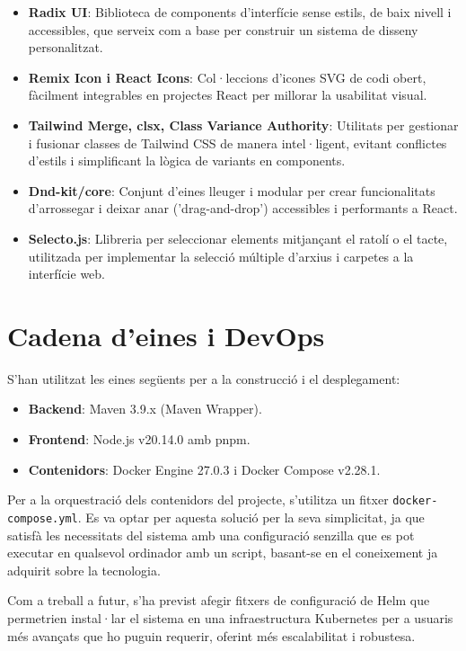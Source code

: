 \begin{itemize}
\item \textbf{Radix UI}: Biblioteca de components d'interfície sense estils, de baix nivell i accessibles, que serveix com a base per construir un sistema de disseny personalitzat.
\item \textbf{Remix Icon i React Icons}: Col·leccions d'icones SVG de codi obert, fàcilment integrables en projectes React per millorar la usabilitat visual.
\item \textbf{Tailwind Merge, clsx, Class Variance Authority}: Utilitats per gestionar i fusionar classes de Tailwind CSS de manera intel·ligent, evitant conflictes d'estils i simplificant la lògica de variants en components.
\item \textbf{Dnd-kit/core}: Conjunt d'eines lleuger i modular per crear funcionalitats d'arrossegar i deixar anar ('drag-and-drop') accessibles i performants a React.
\item \textbf{Selecto.js}: Llibreria per seleccionar elements mitjançant el ratolí o el tacte, utilitzada per implementar la selecció múltiple d'arxius i carpetes a la interfície web.
\end{itemize}

\section{Cadena d'eines i DevOps}
S'han utilitzat les eines següents per a la construcció i el desplegament:

\begin{itemize}
\item \textbf{Backend}: Maven 3.9.x (Maven Wrapper).
\item \textbf{Frontend}: Node.js v20.14.0 amb pnpm.
\item \textbf{Contenidors}: Docker Engine 27.0.3 i Docker Compose v2.28.1.
\end{itemize}

Per a la orquestració dels contenidors del projecte, s'utilitza un fitxer \texttt{docker-compose.yml}. Es va optar per aquesta solució per la seva simplicitat, ja que satisfà les necessitats del sistema amb una configuració senzilla que es pot executar en qualsevol ordinador amb un script, basant-se en el coneixement ja adquirit sobre la tecnologia.

Com a treball a futur, s'ha previst afegir fitxers de configuració de Helm que permetrien instal·lar el sistema en una infraestructura Kubernetes per a usuaris més avançats que ho puguin requerir, oferint més escalabilitat i robustesa. 

